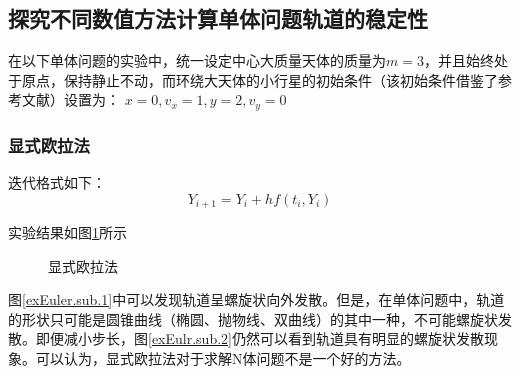 \documentclass{article}
\begin{document}
\subsection{探究不同数值方法计算单体问题轨道的稳定性}
\par 在以下单体问题的实验中，统一设定中心大质量天体的质量为$m=3$，并且始终处于原点，保持静止不动，而环绕大天体的小行星的初始条件（该初始条件借鉴了参考文献\cite{sauer2018数值分析}）设置为：
$x=0, v_x=1, y=2, v_y=0$
\subsubsection{显式欧拉法}
\par 迭代格式如下：
$$Y_{i+1} = Y_i + hf(t_i,Y_i)$$
\par 实验结果如图\ref{exEuler.main}所示
\begin{figure}[H]
	\centering  %
	\caption{显式欧拉法}
	\label{exEuler.main}
\end{figure}
\par 图\ref{exEuler.sub.1}中可以发现轨道呈螺旋状向外发散。但是，在单体问题中，轨道的形状只可能是圆锥曲线（椭圆、抛物线、双曲线）的其中一种，不可能螺旋状发散。即便减小步长，图\ref{exEulr.sub.2}仍然可以看到轨道具有明显的螺旋状发散现象。可以认为，显式欧拉法对于求解N体问题不是一个好的方法。
\end{document}
